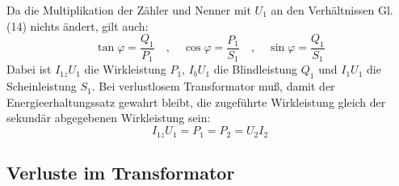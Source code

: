 \documentclass[12pt,a4paper,twoside]{article}
\theoremstyle{definition}
\begin{document}
Da die Multiplikation der Zähler und Nenner mit $U_1$ an den Verhältnissen Gl. (14) nichts ändert, gilt auch:
\begin{equation}
    \tan \varphi = \frac{Q_1}{P_1} \quad , \quad \cos \varphi = \frac{P_1}{S_1} \quad , \quad \sin \varphi = \frac{Q_1}{S_1}
\end{equation}
Dabei ist $I_{1z} U_1$ die Wirkleistung $P_1$, $I_b U_1$ die Blindleistung $Q_1$ und $I_1 U_1$ die Scheinleistung $S_1$. Bei verlustlosem Transformator muß, damit der Energieerhaltungssatz gewahrt bleibt, die zugeführte Wirkleistung gleich der sekundär abgegebenen Wirkleistung sein:
\begin{equation}
    I_{1z} U_1 = P_1 = P_2 = U_2 I_2
\end{equation}


\subsection{Verluste im Transformator}
\end{document}
